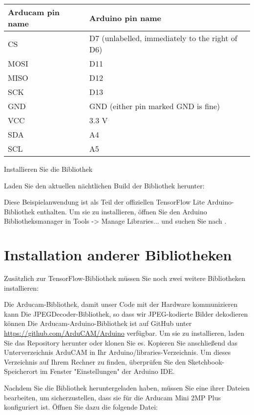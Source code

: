 \begin{tabular}{ll}
  Arducam pin name & Arduino pin name \\ \hline
  CS               & D7 (unlabelled, immediately to the right of D6) \\
  MOSI             & D11 \\
  MISO             & D12 \\
  SCK              & D13 \\
  GND              & GND (either pin marked GND is fine) \\
  VCC              & 3.3 V \\
  SDA              & A4 \\
  SCL              & A5 \\
\end{tabular}

Installieren Sie die Bibliothek 

Laden Sie den aktuellen nächtlichen Build der Bibliothek herunter: 

Diese Beispielanwendung ist als Teil der offiziellen TensorFlow Lite Arduino-Bibliothek enthalten. Um sie zu installieren, öffnen Sie den Arduino Bibliotheksmanager in Tools -> Manage Libraries... und suchen Sie nach .

\section{Installation anderer Bibliotheken}

Zusätzlich zur TensorFlow-Bibliothek müssen Sie noch zwei weitere Bibliotheken installieren:

Die Arducam-Bibliothek, damit unser Code mit der Hardware kommunizieren kann
Die JPEGDecoder-Bibliothek, so dass wir JPEG-kodierte Bilder dekodieren können
Die Arducam-Arduino-Bibliothek ist auf GitHub unter \url{https://github.com/ArduCAM/Arduino} verfügbar. Um sie zu installieren, laden Sie das Repository herunter oder klonen Sie es. Kopieren Sie anschließend das Unterverzeichnis ArduCAM in Ihr Arduino/libraries-Verzeichnis. Um dieses Verzeichnis auf Ihrem Rechner zu finden, überprüfen Sie den Sketchbook-Speicherort im Fenster "Einstellungen" der Arduino IDE.

Nachdem Sie die Bibliothek heruntergeladen haben, müssen Sie eine ihrer Dateien bearbeiten, um sicherzustellen, dass sie für die Arducam Mini 2MP Plus konfiguriert ist. Öffnen Sie dazu die folgende Datei:

